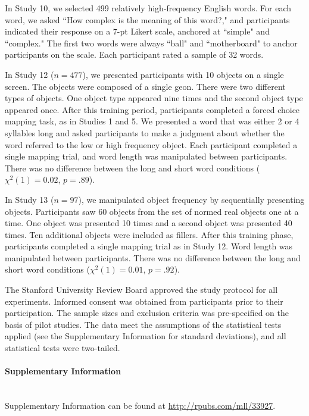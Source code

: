 \documentclass[12pt]{article}
\renewcommand\refname{References and Notes}
\begin{document}
In Study 10, we selected 499 relatively high-frequency English words. For each word, we asked ``How complex is the meaning of this word?," and participants indicated their response on a 7-pt Likert scale, anchored at ``simple" and ``complex." The first two words were always ``ball" and ``motherboard" to anchor participants on the scale. Each participant rated a sample of 32 words.

In Study 12 ($n = 477$), we presented participants with 10 objects on a single screen. The objects were composed of a single geon. There were two different types of objects. One object type appeared nine times and the second object type appeared once. After this training period, participants completed a forced choice mapping task, as in Studies 1 and 5. We presented a word that was either 2 or 4 syllables long and asked participants to make a judgment about whether the word referred to the low or high frequency object. Each participant completed a single mapping trial, and word length was manipulated between participants. There was no difference between the long and short word conditions ($\chi ^2(1) = 0.02$,  $p = .89$).

In Study 13 ($n = 97$), we manipulated object frequency by sequentially presenting objects. Participants saw 60 objects from the  set of normed real objects one at a time. One object was presented 10 times and a second object was presented 40 times. Ten additional objects were included as fillers. After this training phase, participants completed a single mapping trial as in Study 12. Word length was manipulated between participants. There was no difference between the long and short word conditions ($\chi ^2(1) = 0.01$,  $p = .92$).

The Stanford University Review Board approved the study protocol for all experiments. Informed consent was obtained from participants prior to their participation. The sample sizes and exclusion criteria was pre-specified on the basis of pilot studies. The data meet the assumptions of the statistical tests applied (see the Supplementary Information for standard deviations), and all statistical tests were two-tailed.


\renewcommand{\refname}{\normalsize References}



\paragraph*{Supplementary Information}\mbox{}\\
Supplementary Information can be found at \url{http://rpubs.com/mll/33927}.
\end{document}
